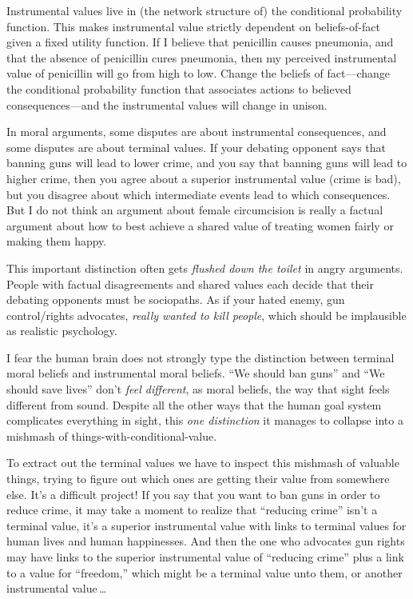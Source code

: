  Instrumental values live in (the network structure of) the
conditional probability function. This makes instrumental value
strictly dependent on beliefs-of-fact given a fixed utility function.
If I believe that penicillin causes pneumonia, and that the absence of
penicillin cures pneumonia, then my perceived instrumental value of
penicillin will go from high to low. Change the beliefs of
fact---change the conditional probability function that associates
actions to believed consequences---and the instrumental values will
change in unison.


 In moral arguments, some disputes are about instrumental
consequences, and some disputes are about terminal values. If your
debating opponent says that banning guns will lead to lower crime, and
you say that banning guns will lead to higher crime, then you agree
about a superior instrumental value (crime is bad), but you disagree
about which intermediate events lead to which consequences. But I do
not think an argument about female circumcision is really a factual
argument about how to best achieve a shared value of treating women
fairly or making them happy.


 This important distinction often gets \textit{flushed down the
toilet} in angry arguments. People with factual disagreements and
shared values each decide that their debating opponents must be
sociopaths. As if your hated enemy, gun control/rights advocates,
\textit{really wanted to kill people}, which should be implausible as
realistic psychology.


 I fear the human brain does not strongly type the distinction
between terminal moral beliefs and instrumental moral beliefs.
``We should ban guns'' and
``We should save lives''
don't \textit{feel different}, as moral beliefs, the
way that sight feels different from sound. Despite all the other ways
that the human goal system complicates everything in sight, this
\textit{one distinction} it manages to collapse into a mishmash of
things-with-conditional-value.


 To extract out the terminal values we have to inspect this
mishmash of valuable things, trying to figure out which ones are
getting their value from somewhere else. It's a
difficult project! If you say that you want to ban guns in order to
reduce crime, it may take a moment to realize that
``reducing crime''
isn't a terminal value, it's a superior
instrumental value with links to terminal values for human lives and
human happinesses. And then the one who advocates gun rights may have
links to the superior instrumental value of ``reducing
crime'' plus a link to a value for
``freedom,'' which might be a
terminal value unto them, or another instrumental value\,\ldots


